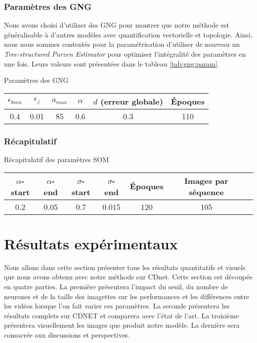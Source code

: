 	\subsubsection{Paramètres des GNG}

	Nous avons choisi d'utiliser des GNG pour montrer que notre méthode est généralisable à d'autres modèles avec quantification vectorielle et topologie. Ainsi, nous nous sommes contentés pour la paramétrisation d'utiliser de nouveau un \textit{Tree-structured Parzen Estimator} pour optimiser l'intégralité des paramètres en une fois. Leurs valeurs sont présentées dans le tableau \ref{tab:gng:param}.

	\begin{tableth}
	\caption[Paramètres GNG]{Paramètres des GNG}
	\begin{tabular}{|c|c|c|c|c|c|}
		\hline
		$\epsilon_{bmu}$ & $\epsilon_{j}$ & $a_{max}$ & $\alpha$ & $d$ (erreur globale) & Époques\\
		\hline
		0.4 & 0.01 & 85 & 0.6 & 0.3 & 110\\
		\hline
	\end{tabular}\label{tab:gng:param}
	\end{tableth}

	\subsubsection{Récapitulatif}\label{sec:param:recap}

	\begin{tableth}
	\caption[Récapitulatif des paramètres SOM]{Récapitulatif des paramètres SOM}
	\begin{tabular}{|cc|cc|c|c|c|}
		\hline
		$\alpha$-start	& $\alpha$-end & $\sigma$-start & $\sigma$-end & Époques & Images par séquence\\
		\hline
		0.2 & 0.05 & 0.7 & 0.015 & 120 & 105\\
		\hline
	\end{tabular}\label{tab:recap:param}
	\end{tableth}


	\newpage

	\section{Résultats expérimentaux}

	Nous allons dans cette section présenter tous les résultats quantitatifs et visuels que nous avons obtenu avec notre méthode sur CDnet. Cette section est découpée en quatre parties. La première présentera l'impact du seuil, du nombre de neurones et de la taille des imagettes sur les performances et les différences entre les vidéos lorsque l'on fait varier ces paramètres. La seconde présentera les résultats complets sur CDNET et comparera avec l'état de l'art. La troisième présentera visuellement les images que produit notre modèle. La dernière sera consacrée aux discussions et perspectives.

